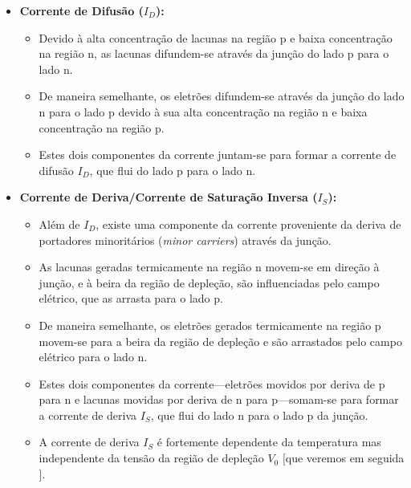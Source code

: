 \vspace{-1em}
\begin{itemize}[leftmargin=*, noitemsep]
    \item \textbf{Corrente de Difusão ($I_D$):}
    \begin{itemize}[leftmargin=*, label=$\pmb{-}$]
        \item Devido à alta concentração de lacunas na região p e baixa concentração na região n, as lacunas difundem-se através da junção do lado p para o lado n.
        \item De maneira semelhante, os eletrões difundem-se através da junção do lado n para o lado p devido à sua alta concentração na região n e baixa concentração na região p.
        \item Estes dois componentes da corrente juntam-se para formar a corrente de difusão $I_D$, que flui do lado p para o lado n.
    \end{itemize}
    
    \item \textbf{Corrente de Deriva/Corrente de Saturação Inversa ($I_S$):}
    \begin{itemize}[leftmargin=*, label=$\pmb{-}$]
        \item Além de $I_D$, existe uma componente da corrente proveniente da deriva de portadores minoritários (\textit{minor carriers}) através da junção.
        \item As lacunas geradas termicamente na região n movem-se em direção à junção, e à beira da região de depleção, são influenciadas pelo campo elétrico, que as arrasta para o lado p.
        \item De maneira semelhante, os eletrões gerados termicamente na região p movem-se para a beira da região de depleção e são arrastados pelo campo elétrico para o lado n.
        \item Estes dois componentes da corrente---eletrões movidos por deriva de p para n e lacunas movidas por deriva de n para p---somam-se para formar a corrente de deriva $I_S$, que flui do lado n para o lado p da junção.
        \item A corrente de deriva $I_S$ é fortemente dependente da temperatura mas independente da tensão da região de depleção $V_0$ $[$que veremos em seguida$]$.
    \end{itemize}
\end{itemize}

